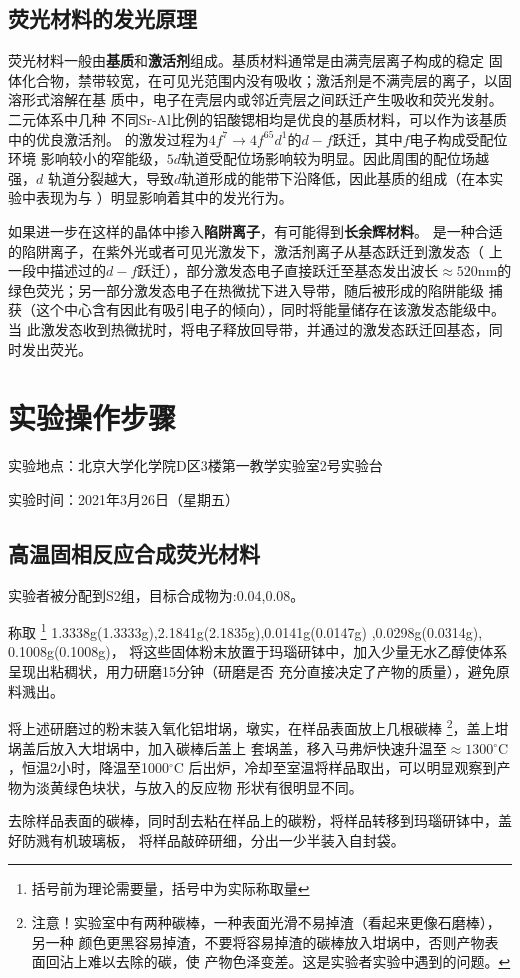 \documentclass[a4paper,zihao=5,UTF8]{ctexart}
\newcommand{\mr}[1]{\mathrm{#1}}
\def\celsius{$^{\circ}\mr{C}$}
\begin{document}
	\subsection{荧光材料的发光原理}
	荧光材料一般由\textbf{基质}和\textbf{激活剂}组成。基质材料通常是由满壳层离子构成的稳定
	固体化合物，禁带较宽，在可见光范围内没有吸收；激活剂是不满壳层的离子，以固溶形式溶解在基
	质中，电子在壳层内或邻近壳层之间跃迁产生吸收和荧光发射。二元体系中几种
	不同Sr-Al比例的铝酸锶相均是优良的基质材料，可以作为该基质中的优良激活剂。
	的激发过程为$4f^7\to4f^ 65d ^1$的$d-f$跃迁，其中$f$电子构成受配位环境
	影响较小的窄能级，$5d$轨道受配位场影响较为明显。因此周围的配位场越强，$d$
	轨道分裂越大，导致$d$轨道形成的能带下沿降低，因此基质的组成（在本实验中表现为与
	）明显影响着其中的发光行为。
	\par 
	如果进一步在这样的晶体中掺入\textbf{陷阱离子}，有可能得到\textbf{长余辉材料}。
	是一种合适的陷阱离子，在紫外光或者可见光激发下，激活剂离子从基态跃迁到激发态（
	上一段中描述过的$d-f$跃迁），部分激发态电子直接跃迁至基态发出波长$\approx 520\mr{nm}$的
	绿色荧光；另一部分激发态电子在热微扰下进入导带，随后被形成的陷阱能级
	捕获（这个中心含有因此有吸引电子的倾向），同时将能量储存在该激发态能级中。当
	此激发态收到热微扰时，将电子释放回导带，并通过的激发态跃迁回基态，同时发出荧光。
	\section{实验操作步骤}
	实验地点：北京大学化学院D区3楼第一教学实验室2号实验台
	\par 
	实验时间：2021年3月26日（星期五）
	\subsection{高温固相反应合成荧光材料}
	实验者被分配到S2组，目标合成物为:0.04,0.08。
	\par 
	称取
	\footnote{括号前为理论需要量，括号中为实际称取量}
	1.3338g(1.3333g),2.1841g(2.1835g),0.0141g(0.0147g)
	,0.0298g(0.0314g),\\0.1008g(0.1008g)，
	将这些固体粉末放置于玛瑙研钵中，加入少量无水乙醇使体系呈现出粘稠状，用力研磨15分钟（研磨是否
	充分直接决定了产物的质量），避免原料溅出。
	\par
	将上述研磨过的粉末装入氧化铝坩埚，墩实，在样品表面放上几根碳棒
	\footnote{注意！实验室中有两种碳棒，一种表面光滑不易掉渣（看起来更像石磨棒），另一种
	颜色更黑容易掉渣，不要将容易掉渣的碳棒放入坩埚中，否则产物表面回沾上难以去除的碳，使
	产物色泽变差。这是实验者实验中遇到的问题。}，盖上坩埚盖后放入大坩埚中，加入碳棒后盖上
	套埚盖，移入马弗炉快速升温至$\approx 1300$\celsius，恒温2小时，降温至1000\celsius
	后出炉，冷却至室温将样品取出，可以明显观察到产物为淡黄绿色块状，与放入的反应物
	形状有很明显不同。
	\par 
	去除样品表面的碳棒，同时刮去粘在样品上的碳粉，将样品转移到玛瑙研钵中，盖好防溅有机玻璃板，
	将样品敲碎研细，分出一少半装入自封袋。
\end{document}
